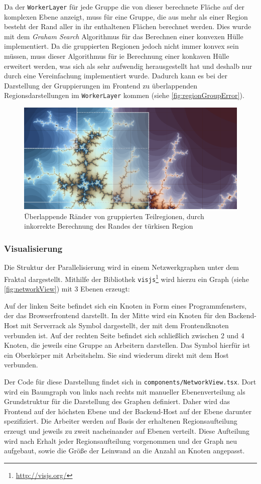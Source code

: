 Da der \verb|WorkerLayer| für jede Gruppe die von dieser berechnete Fläche auf der komplexen Ebene anzeigt,
muss für eine Gruppe, die aus mehr als einer Region besteht der Rand aller in ihr enthaltenen Flächen berechnet werden.
Dies wurde mit dem \textit{Graham Search}\cite{Cormen} Algorithmus für das Berechnen einer konvexen Hülle implementiert.
Da die gruppierten Regionen jedoch nicht immer konvex sein müssen, muss dieser Algorithmus für ie Berechnung einer konkaven Hülle erweitert
werden, was sich als sehr aufwendig herausgestellt hat und deshalb nur durch eine Vereinfachung implementiert wurde.
Dadurch kann es bei der Darstellung der Gruppierungen im Frontend zu überlappenden Regionsdarstellungen im \verb|WorkerLayer| kommen (siehe \autoref{fig:regionGroupError}).
\begin{figure}[h!]
	\centering
	\includegraphics[width=.45\linewidth]{img/Implementierung/region_group_error}
	\caption{Überlappende Ränder von gruppierten Teilregionen, durch inkorrekte Berechnung des Randes der türkisen Region
	}\label{fig:regionGroupError}
\end{figure}
\subsubsection{Visualisierung}

Die Struktur der Parallelisierung wird in einem Netzwerkgraphen unter dem Fraktal dargestellt.
Mithilfe der Bibliothek \verb|visjs|\footnote{\url{http://visjs.org/}} wird hierzu ein
Graph (siehe \autoref{fig:networkView}) mit 3 Ebenen erzeugt:

Auf der linken Seite befindet sich ein Knoten in Form eines Programmfensters, der das Browserfrontend darstellt.
In der Mitte wird ein Knoten für den Backend-Host mit Serverrack als Symbol dargestellt, der mit dem Frontendknoten verbunden ist.
Auf der rechten Seite befindet sich schließlich zwischen 2 und 4 Knoten, die jeweils eine Gruppe an Arbeitern
darstellen. Das Symbol hierfür ist ein Oberkörper mit Arbeitshelm.
Sie sind wiederum direkt mit dem Host verbunden.

Der Code für diese Darstellung findet sich in \verb|components/NetworkView.tsx|.
Dort wird ein Baumgraph von links nach rechts mit manueller Ebenenverteilung als Grundstruktur für die Darstellung des Graphen definiert.
Daher wird das Frontend auf der höchsten Ebene und der Backend-Host auf der Ebene darunter spezifiziert.
Die Arbeiter werden auf Basis der erhaltenen Regionsaufteilung erzeugt und jeweils zu zweit nacheinander
auf Ebenen verteilt.
Diese Aufteilung wird nach Erhalt jeder Regionsaufteilung vorgenommen und der Graph neu aufgebaut,
sowie die Größe der Leinwand an die Anzahl an Knoten angepasst.


